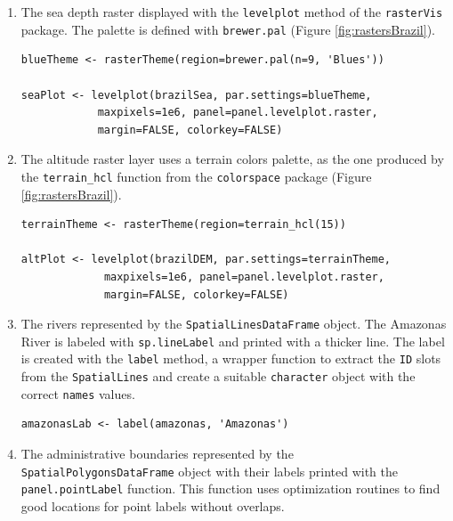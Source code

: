 \begin{enumerate}
\item The sea depth raster displayed with the \texttt{levelplot} method of the
\texttt{rasterVis} package. The palette is defined with \texttt{brewer.pal}
(Figure \ref{fig:rastersBrazil}).
\lstset{language=R,numbers=none}
\begin{lstlisting}
blueTheme <- rasterTheme(region=brewer.pal(n=9, 'Blues'))

seaPlot <- levelplot(brazilSea, par.settings=blueTheme,
		    maxpixels=1e6, panel=panel.levelplot.raster,
		    margin=FALSE, colorkey=FALSE)
\end{lstlisting}


\item The altitude raster layer uses a terrain colors palette, as the one
produced by the \texttt{terrain\_hcl} function from the \texttt{colorspace} package
\cite{Ihaka.Murrell.ea2011} (Figure \ref{fig:rastersBrazil}).
\lstset{language=R,numbers=none}
\begin{lstlisting}
terrainTheme <- rasterTheme(region=terrain_hcl(15))

altPlot <- levelplot(brazilDEM, par.settings=terrainTheme,
		     maxpixels=1e6, panel=panel.levelplot.raster,
		     margin=FALSE, colorkey=FALSE)
\end{lstlisting}


\item The rivers represented by the \texttt{SpatialLinesDataFrame} object. The
Amazonas River is labeled with \texttt{sp.lineLabel} and printed with a
thicker line. The label is created with the \texttt{label} method, a
wrapper function to extract the \texttt{ID} slots from the \texttt{SpatialLines}
and create a suitable \texttt{character} object with the correct \texttt{names}
values.

\lstset{language=R,numbers=none}
\begin{lstlisting}
amazonasLab <- label(amazonas, 'Amazonas')
\end{lstlisting}

\item The administrative boundaries represented by the
\texttt{SpatialPolygonsDataFrame} object with their labels printed with
the \texttt{panel.pointLabel} function. This function uses optimization
routines to find good locations for point labels without overlaps.


\end{enumerate}
